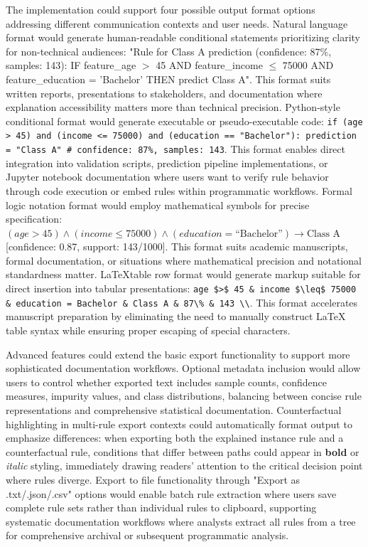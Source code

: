 The implementation could support four possible output format options addressing different communication contexts and user needs. Natural language format would generate human-readable conditional statements prioritizing clarity for non-technical audiences: "Rule for Class A prediction (confidence: 87\%, samples: 143): IF feature\_age $>$ 45 AND feature\_income $\leq$ 75000 AND feature\_education = 'Bachelor' THEN predict Class A". This format suits written reports, presentations to stakeholders, and documentation where explanation accessibility matters more than technical precision. Python-style conditional format would generate executable or pseudo-executable code: \texttt{if (age > 45) and (income <= 75000) and (education == "Bachelor"): prediction = "Class A"  \# confidence: 87\%, samples: 143}. This format enables direct integration into validation scripts, prediction pipeline implementations, or Jupyter notebook documentation where users want to verify rule behavior through code execution or embed rules within programmatic workflows. Formal logic notation format would employ mathematical symbols for precise specification: $(age > 45) \wedge (income \leq 75000) \wedge (education = \text{``Bachelor''}) \rightarrow \text{Class A}$ [confidence: 0.87, support: 143/1000]. This format suits academic manuscripts, formal documentation, or situations where mathematical precision and notational standardness matter. \LaTeX table row format would generate markup suitable for direct insertion into tabular presentations: \texttt{age \$>\$ 45 \& income \$\textbackslash leq\$ 75000 \& education = Bachelor \& Class A \& 87\textbackslash\% \& 143 \textbackslash\textbackslash}. This format accelerates manuscript preparation by eliminating the need to manually construct LaTeX table syntax while ensuring proper escaping of special characters.

Advanced features could extend the basic export functionality to support more sophisticated documentation workflows. Optional metadata inclusion would allow users to control whether exported text includes sample counts, confidence measures, impurity values, and class distributions, balancing between concise rule representations and comprehensive statistical documentation. Counterfactual highlighting in multi-rule export contexts could automatically format output to emphasize differences: when exporting both the explained instance rule and a counterfactual rule, conditions that differ between paths could appear in \textbf{bold} or \textit{italic} styling, immediately drawing readers' attention to the critical decision point where rules diverge. Export to file functionality through "Export as .txt/.json/.csv" options would enable batch rule extraction where users save complete rule sets rather than individual rules to clipboard, supporting systematic documentation workflows where analysts extract all rules from a tree for comprehensive archival or subsequent programmatic analysis.

